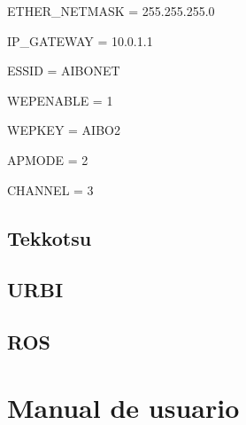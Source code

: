 \documentclass[12pt,a4paper,final,twoside]{article}
\begin{document}
ETHER{\_}NETMASK = 255.255.255.0

IP{\_}GATEWAY = 10.0.1.1

ESSID = AIBONET

WEPENABLE = 1

WEPKEY = AIBO2

APMODE = 2

CHANNEL = 3 
\subsection{Tekkotsu}
\subsection{URBI}
\subsection{ROS}

\newpage

\section{Manual de usuario}
\end{document}
